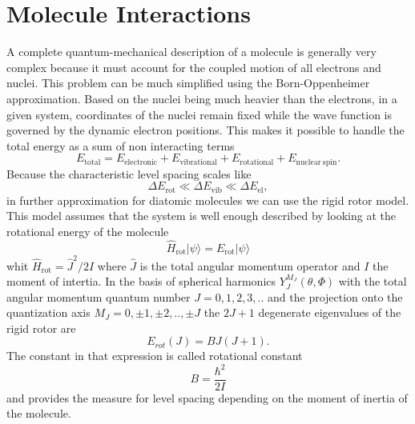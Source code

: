 
\section{Molecule Interactions}
\label{sec:molecule_interaction}

A complete quantum-mechanical description of a molecule is generally very complex because it must account for the coupled motion of all electrons and nuclei. This problem can be much simplified using the Born-Oppenheimer approximation. Based on the nuclei being much heavier than the electrons, in a given system, coordinates of the nuclei remain fixed while the wave function is governed by the dynamic electron positions. This makes it possible to handle the total energy as a sum of non interacting terms
\begin{equation}
    E_{\mathrm{total}} = E_{\mathrm{electronic}} + E_{\mathrm{vibrational}} + E_{\mathrm{rotational}} + E_{\mathrm{nuclear\ spin}}.
    \label{eq:energy_sum}
\end{equation}
Because the characteristic level spacing scales like
\begin{equation}
    \Delta E_{\mathrm{rot}} \ll \Delta E_{\mathrm{vib}} \ll \Delta E_{\mathrm{el}},
    \label{eq:level_spacing}
\end{equation}
in further approximation for diatomic molecules we can use the rigid rotor model. This model assumes that the system is well enough described by looking at the rotational energy of the molecule
\begin{equation}
    \hat{H}_{\mathrm{rot}} \lvert \psi \rangle = E_{\mathrm{rot}} \lvert \psi \rangle
    \label{eq:rigid_rotor_se}
\end{equation}
whit $\hat{H}_{\mathrm{rot}} = \hat J^2 / 2I$ where $\hat J$ is the total angular momentum operator and $I$ the moment of intertia. In the basis of spherical harmonics $Y_J^{M_J}(\theta, \Phi)$ with the total angular momentum quantum number $J = 0, 1, 2,3,..$ and the projection onto the quantization axis $M_J = 0, \pm 1, \pm 2, .., \pm J$ the $2J+1$ degenerate eigenvalues of the rigid rotor are
\begin{equation}
    E_{rot}(J) = BJ(J+1).
    \label{eq:rigid_rotor_energy}
\end{equation}
The constant in that expression is called rotational constant
\begin{equation}
    B = \frac{\hbar^2}{2I}
    \label{eq:rotational_constant}
\end{equation}
and provides the measure for level spacing depending on the moment of inertia of the molecule.

